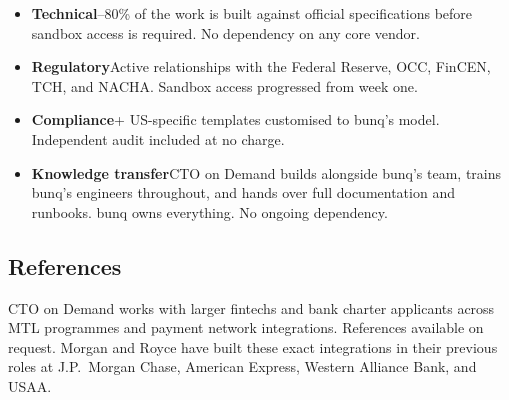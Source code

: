 \begin{itemize}
\item \textbf{Technical}--80\% of the work is built against official specifications before sandbox access is required. No dependency on any core vendor.
\item \textbf{Regulatory}\dash Active relationships with the Federal Reserve, OCC, FinCEN, TCH, and NACHA. Sandbox access progressed from week one.
\item \textbf{Compliance}+ US-specific templates customised to bunq's model. Independent audit included at no charge.
\item \textbf{Knowledge transfer}\dash CTO on Demand builds alongside bunq's team, trains bunq's engineers throughout, and hands over full documentation and runbooks. bunq owns everything. No ongoing dependency.
\end{itemize}

\subsection{References}

CTO on Demand works with larger fintechs and bank charter applicants across MTL programmes and payment network integrations. References available on request. Morgan and Royce have built these exact integrations in their previous roles at J.P.\ Morgan Chase, American Express, Western Alliance Bank, and USAA.
